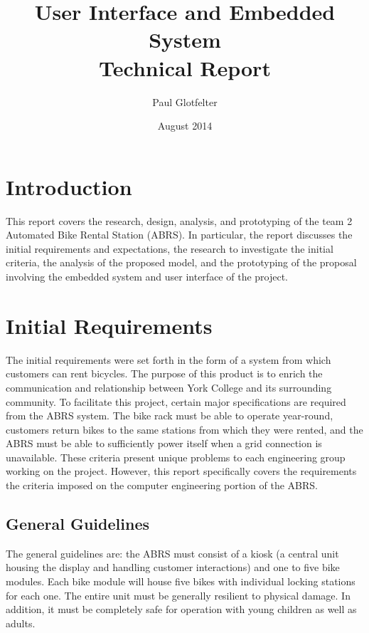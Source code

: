 \documentclass[11pt,a4paper,onesides]{report}
\begin{document}
\title{User Interface and Embedded System  \\ Technical Report}
\author{Paul Glotfelter}
\date{August 2014}
\maketitle

\chapter{Introduction}

This report covers the research, design, analysis, and prototyping of the team 2 Automated Bike Rental Station (ABRS).  In particular, the report discusses the initial requirements and expectations, the research to investigate the initial criteria, the analysis of the proposed model, and the prototyping of the proposal involving the embedded system and user interface of the project.  

\chapter{Initial Requirements}

The initial requirements were set forth in the form of a system from which customers can rent bicycles.  The purpose of this product is to enrich the communication and relationship between York College and its surrounding community.  To facilitate this project, certain major specifications are required from the ABRS system.  The bike rack must be able to operate year-round, customers return bikes to the same stations from which they were rented, and the ABRS must be able to sufficiently power itself when a grid connection is unavailable.  These criteria present unique problems to each engineering group working on the project.  However, this report specifically covers the requirements the criteria imposed on the computer engineering portion of the ABRS.  

\section{General Guidelines}

The general guidelines are: the ABRS must consist of a kiosk (a central unit housing the display and handling customer interactions) and one to five bike modules.  Each bike module will house five bikes with individual locking stations for each one.  The entire unit must be generally resilient to physical damage.  In addition, it must be completely safe for operation with young children as well as adults.    
\end{document}
